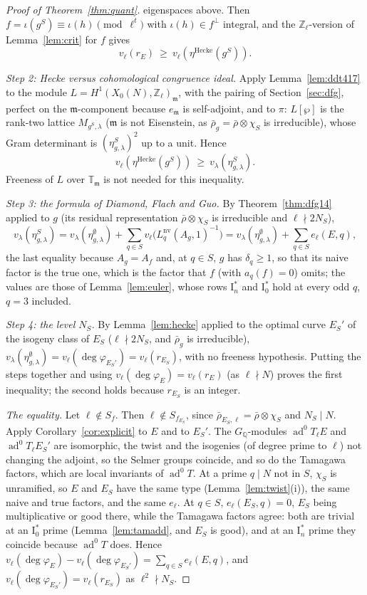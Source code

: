 \documentclass[11pt]{amsart}
\theoremstyle{definition}
\newcommand{\Q}{\mathbb{Q}}
\newcommand{\Z}{\mathbb{Z}}
\newcommand{\T}{\mathbb{T}}
\newcommand{\degphi}{\deg\varphi_E}
\newcommand{\ad}{\operatorname{ad}^0}
\newcommand{\nv}{\mathrm{nv}}
\begin{document}
\begin{proof}[Proof of Theorem~\ref{thm:quant}]
eigenspaces above. Then $f=\iota(g^S)\equiv\iota(h)\pmod{\ell^t}$ with $\iota(h)\in f^\perp$ integral, and the $\Z_\ell$-version of Lemma~\ref{lem:crit} for $f$ gives
\[
v_\ell(r_E)\ \ge\ v_\ell(\eta^{\mathrm{Hecke}}(g^S)).
\]

\emph{Step 2: Hecke versus cohomological congruence ideal.} Apply Lemma~\ref{lem:ddt417} to the module $L=H^1(X_0(N),\Z_\ell)_{\mathfrak m}$, with the pairing of Section~\ref{sec:dfg}, perfect on the $\mathfrak m$-component because $e_{\mathfrak m}$ is self-adjoint, and to $\pi$: $L[\wp]$ is the rank-two lattice $M_{g^S,\lambda}$ ($\mathfrak m$ is not Eisenstein, as $\bar\rho_g=\bar\rho\otimes\chi_S$ is irreducible), whose Gram determinant is $(\eta^S_{g,\lambda})^2$ up to a unit. Hence
\[
v_\ell(\eta^{\mathrm{Hecke}}(g^S))\ \ge\ v_\lambda(\eta^S_{g,\lambda}).
\]
Freeness of $L$ over $\T_{\mathfrak m}$ is not needed for this inequality.

\emph{Step 3: the formula of Diamond, Flach and Guo.} By Theorem~\ref{thm:dfg14} applied to $g$ (its residual representation $\bar\rho\otimes\chi_S$ is irreducible and $\ell\nmid 2N_S$),
\[
v_\lambda(\eta^S_{g,\lambda})=v_\lambda(\eta^\emptyset_{g,\lambda})+\sum_{q\in S}v_\ell\bigl(L_q^{\nv}(A_g,1)^{-1}\bigr)=v_\lambda(\eta^\emptyset_{g,\lambda})+\sum_{q\in S}e_\ell(E,q),
\]
the last equality because $A_g=A_f$ and, at $q\in S$, $g$ has $\delta_q\ge1$, so that its naive factor is the true one, which is the factor that $f$ (with $a_q(f)=0$) omits; the values are those of Lemma~\ref{lem:euler}, whose rows $\mathrm{I}_n^*$ and $\mathrm{I}_0^*$ hold at every odd $q$, $q=3$ included.

\emph{Step 4: the level $N_S$.} By Lemma~\ref{lem:hecke} applied to the optimal curve $E_S'$ of the isogeny class of $E_S$ ($\ell\nmid2N_S$, and $\bar\rho_g$ is irreducible), $v_\lambda(\eta^\emptyset_{g,\lambda})=v_\ell(\deg\varphi_{E_S'})=v_\ell(r_{E_S})$, with no freeness hypothesis. Putting the steps together and using $v_\ell(\degphi)=v_\ell(r_E)$ (as $\ell\nmid N$) proves the first inequality; the second holds because $r_{E_S}$ is an integer.

\emph{The equality.} Let $\ell\notin S_f$. Then $\ell\notin S_{f_{E_S}}$, since $\bar\rho_{E_S,\ell}=\bar\rho\otimes\chi_S$ and $N_S\mid N$. Apply Corollary~\ref{cor:explicit} to $E$ and to $E_S'$. The $G_\Q$-modules $\ad T_\ell E$ and $\ad T_\ell E_S'$ are isomorphic, the twist and the isogenies (of degree prime to $\ell$) not changing the adjoint, so the Selmer groups coincide, and so do the Tamagawa factors, which are local invariants of $\ad T$. At a prime $q\mid N$ not in $S$, $\chi_S$ is unramified, so $E$ and $E_S$ have the same type (Lemma~\ref{lem:twist}(i)), the same naive and true factors, and the same $e_\ell$. At $q\in S$, $e_\ell(E_S,q)=0$, $E_S$ being multiplicative or good there, while the Tamagawa factors agree: both are trivial at an $\mathrm{I}_0^*$ prime (Lemma~\ref{lem:tamadd}, and $E_S$ is good), and at an $\mathrm{I}_n^*$ prime they coincide because $\ad T$ does. Hence $v_\ell(\degphi)-v_\ell(\deg\varphi_{E_S'})=\sum_{q\in S}e_\ell(E,q)$, and $v_\ell(\deg\varphi_{E_S'})=v_\ell(r_{E_S})$ as $\ell^2\nmid N_S$.
\end{proof}
\end{document}
